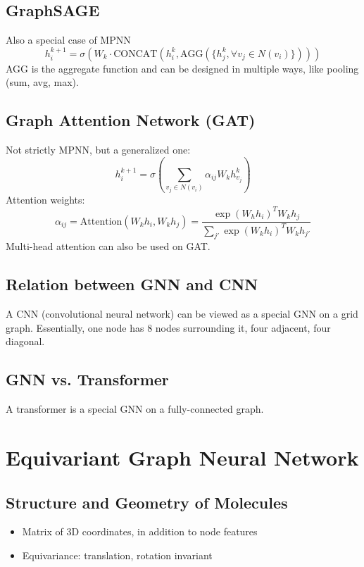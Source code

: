 \documentclass[10pt]{article}
\begin{document}
\subsection*{GraphSAGE}
Also a special case of MPNN
\[h_i^{k + 1} = \sigma(W_k \cdot \text{CONCAT}(h_i^k, \text{AGG}(\{h_j^k, \forall v_j \in N(v_i)\})))\]
AGG is the aggregate function and can be designed in multiple ways, like pooling (sum, avg, max).

\subsection*{Graph Attention Network (GAT)}
Not strictly MPNN, but a generalized one:
\[h_i^{k + 1} = \sigma \left(\sum_{v_j \in N(v_i)} \alpha_{ij} W_k h_{v_j}^k\right)\]
Attention weights:
\[\alpha_{ij} = \text{Attention}(W_k h_i, W_k h_j) = \frac{\exp(W_h h_i)^T W_k h_j}{\sum_{j'} \exp(W_k h_i)^T W_k h_{j'}}\]
Multi-head attention can also be used on GAT.

\subsection*{Relation between GNN and CNN}
A CNN (convolutional neural network) can be viewed as a special GNN on a grid graph.  Essentially, one node has 8 nodes surrounding it, four adjacent, four diagonal.

\subsection*{GNN vs. Transformer}
A transformer is a special GNN on a fully-connected graph.

\section*{Equivariant Graph Neural Network}
\subsection*{Structure and Geometry of Molecules}
\begin{itemize}
	\item Matrix of 3D coordinates, in addition to node features
	\item Equivariance: translation, rotation invariant
\end{itemize}
\end{document}
